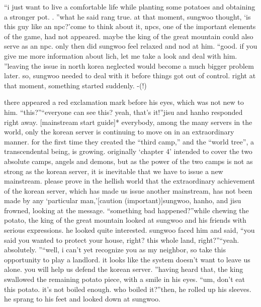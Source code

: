  “i just want to live a comfortable life while planting some potatoes and obtaining a stronger pot.
.
”what he said rang true.
at that moment, sungwoo thought, ‘is this guy like an npc?’come to think about it, npcs, one of the important elements of the game, had not appeared.
maybe the king of the great mountain could also serve as an npc.
only then did sungwoo feel relaxed and nod at him.
“good.
 if you give me more information about lich, let me take a look and deal with him.
”leaving the issue in north korea neglected would become a much bigger problem later.
 so, sungwoo needed to deal with it before things got out of control.
right at that moment, something started suddenly.
-(!)

there appeared a red exclamation mark before his eyes, which was not new to him.
“this?”“everyone can see this? yeah, that’s it!”jisu and hanho responded right away.
[mainstream start guide]* everybody, among the many servers in the world, only the korean server is continuing to move on in an extraordinary manner.
 for the first time they created the “third camp,” and the “world tree”, a transcendental being, is growing.
originally ‘chapter 4’ intended to cover the two absolute camps, angels and demons, but as the power of the two camps is not as strong as the korean server, it is inevitable that we have to issue a new mainstream.
 please prove in the hellish world that the extraordinary achievement of the korean server, which has made us issue another mainstream, has not been made by any ‘particular man,’[caution (important)]sungwoo, hanho, and jisu frowned, looking at the message.
“something bad happened?”while chewing the potato, the king of the great mountain looked at sungwoo and his friends with serious expressions.
 he looked quite interested.
sungwoo faced him and said, “you said you wanted to protect your house, right? this whole land, right?”“yeah.
 absolutely.
”“well, i can’t yet recognize you as my neighbor, so take this opportunity to play a landlord.
 it looks like the system doesn’t want to leave us alone.
 you will help us defend the korean server.
”having heard that, the king swallowed the remaining potato piece, with a smile in his eyes.
“um, don’t eat this potato.
 it’s not boiled enough.
 who boiled it?”then, he rolled up his sleeves.
 he sprang to his feet and looked down at sungwoo.


 